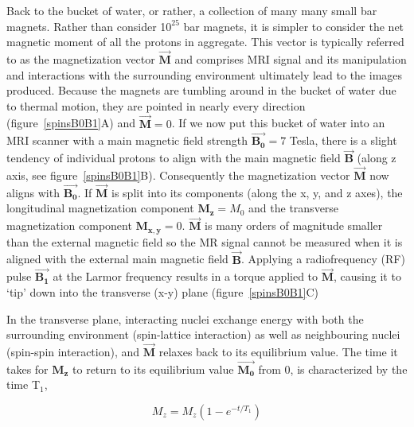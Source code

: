 Back to the bucket of water, or rather, a collection of many many small bar magnets.
Rather than consider 1$0^{25}$ bar magnets, it is simpler to consider the net magnetic moment of all the protons in aggregate.
This vector is typically referred to as the magnetization vector $\vec{\mathbf{M}}$ and comprises MRI signal and its manipulation and interactions with the surrounding environment ultimately lead to the images produced.
Because the magnets are tumbling around in the bucket of water due to thermal motion, they are pointed in nearly every direction (figure~\ref{spinsB0B1}A) and $\vec{\mathbf{M}} = 0$.
If we now put this bucket of water into an MRI scanner with a main magnetic field strength $\vec{\mathbf{B_0}} = 7$ Tesla, there is a slight tendency of individual protons to align with the main magnetic field $\vec{\mathbf{B}}$ (along z axis, see figure~\ref{spinsB0B1}B).
Consequently the magnetization vector $\vec{\mathbf{M}}$ now aligns with $\vec{\mathbf{B_0}}$.
If $\vec{\mathbf{M}}$ is split into its components (along the x, y, and z axes), the longitudinal magnetization component $\mathbf{M_z} = M_0$ and the transverse magnetization component $\mathbf{M_{x,y}} = 0$.
$\vec{\mathbf{M}}$ is many orders of magnitude smaller than the external magnetic field so the MR signal cannot be measured when it is aligned with the external main magnetic field $\vec{\mathbf{B}}$. 
Applying a radiofrequency (RF) pulse $\vec{\mathbf{B_1}}$ at the Larmor frequency results in a torque applied to $\vec{\mathbf{M}}$, causing it to `tip' down into the transverse (x-y) plane (figure~\ref{spinsB0B1}C)

In the transverse plane, interacting nuclei exchange energy with both the surrounding environment (spin-lattice interaction) as well as neighbouring nuclei (spin-spin interaction), and $\vec{\mathbf{M}}$ relaxes back to its equilibrium value. 
The time it takes for $\mathbf{M_z}$ to return to its equilibrium value $\vec{\mathbf{M_0}}$ from 0, is characterized by the time T$_1$,

\begin{equation}
	M_z = M_z(1-e^{-t/T_1})
	\label{T1}
\end{equation}

